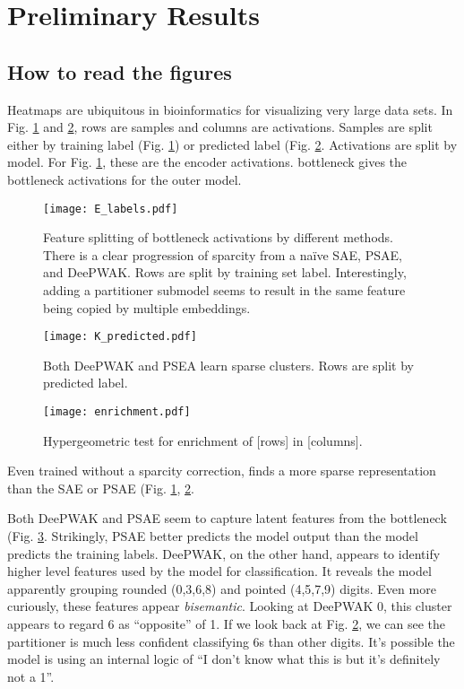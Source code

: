 \section{Preliminary Results}

\subsection{How to read the figures}
\label{sec:heatmaps}
Heatmaps are ubiquitous in bioinformatics for visualizing very large data sets.
In Fig. \ref{fig:E_MNIST} and \ref{fig:K_MNIST}, rows are samples and columns are activations.
Samples are split either by training label (Fig. \ref{fig:E_MNIST}) or predicted label (Fig. \ref{fig:K_MNIST}.
Activations are split by model.
For Fig. \ref{fig:E_MNIST}, these are the encoder activations.
\textsf{bottleneck} gives the bottleneck activations for the outer model.


\begin{figure}
  \texttt{[image: E\_labels.pdf]}
  \caption{Feature splitting of bottleneck activations by different methods.
    There is a clear progression of sparcity from a na\"ive SAE, PSAE, and DeePWAK.
    Rows are split by training set label.
    Interestingly, adding a partitioner submodel seems to result in the same feature being copied by multiple embeddings.}
    \label{fig:E_MNIST}
\end{figure}

\begin{figure}
  \texttt{[image: K\_predicted.pdf]}
    \caption{Both DeePWAK and PSEA learn sparse clusters. Rows are split by predicted label.}
    \label{fig:K_MNIST}
\end{figure}

\begin{figure}
  \texttt{[image: enrichment.pdf]}
    \caption{Hypergeometric test for enrichment of [rows] in [columns].}
    \label{fig:hyperMNIST}
\end{figure}

Even trained without a sparcity correction, \DeePWAK finds a more sparse representation than the SAE or PSAE (Fig. \ref{fig:E_MNIST}, \ref{fig:K_MNIST}.

Both DeePWAK and PSAE seem to capture latent features from the bottleneck (Fig. \ref{fig:hyperMNIST}.
Strikingly, PSAE better predicts the model output than the model predicts the training labels.
DeePWAK, on the other hand, appears to identify higher level features used by the model for classification.
It reveals the model apparently grouping rounded (0,3,6,8) and pointed (4,5,7,9) digits. 
Even more curiously, these features appear \textit{bisemantic}.
Looking at \textsf{DeePWAK 0}, this cluster appears to regard 6 as ``opposite'' of 1.
If we look back at Fig. \ref{fig:K_MNIST}, we can see the partitioner is much less confident classifying 6s than other digits.
It's possible the model is using an internal logic of ``I don't know what this is but it's definitely not a 1''.

